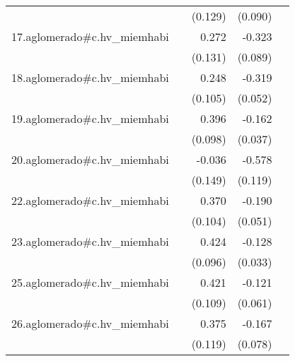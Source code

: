 {\begin{longtable}{l*{4}{D{.}{.}{-1}}}
            &                     &     (0.129)         &     (0.090)         &                     \\
\addlinespace
17.aglomerado#c.hv\_miemhabi&                     &       0.272\sym{*}  &      -0.323\sym{***}&                     \\
            &                     &     (0.131)         &     (0.089)         &                     \\
\addlinespace
18.aglomerado#c.hv\_miemhabi&                     &       0.248\sym{*}  &      -0.319\sym{***}&                     \\
            &                     &     (0.105)         &     (0.052)         &                     \\
\addlinespace
19.aglomerado#c.hv\_miemhabi&                     &       0.396\sym{***}&      -0.162\sym{***}&                     \\
            &                     &     (0.098)         &     (0.037)         &                     \\
\addlinespace
20.aglomerado#c.hv\_miemhabi&                     &      -0.036         &      -0.578\sym{***}&                     \\
            &                     &     (0.149)         &     (0.119)         &                     \\
\addlinespace
22.aglomerado#c.hv\_miemhabi&                     &       0.370\sym{***}&      -0.190\sym{***}&                     \\
            &                     &     (0.104)         &     (0.051)         &                     \\
\addlinespace
23.aglomerado#c.hv\_miemhabi&                     &       0.424\sym{***}&      -0.128\sym{***}&                     \\
            &                     &     (0.096)         &     (0.033)         &                     \\
\addlinespace
25.aglomerado#c.hv\_miemhabi&                     &       0.421\sym{***}&      -0.121\sym{*}  &                     \\
            &                     &     (0.109)         &     (0.061)         &                     \\
\addlinespace
26.aglomerado#c.hv\_miemhabi&                     &       0.375\sym{**} &      -0.167\sym{*}  &                     \\
            &                     &     (0.119)         &     (0.078)         &                     \\

\end{longtable}}
